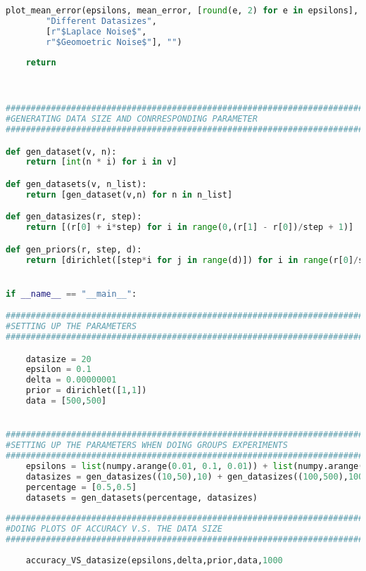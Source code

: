 \begin{lstlisting}[label = code-p2-2a, language=Python, caption=Python Code for experimenting]
	plot_mean_error(epsilons, mean_error, [round(e, 2) for e in epsilons], 
		"Different Datasizes", 
		[r"$Laplace Noise$",
		r"$Geomoetric Noise$"], "")
	
	return



#############################################################################
#GENERATING DATA SIZE AND CONRRESPONDING PARAMETER
#############################################################################

def gen_dataset(v, n):
	return [int(n * i) for i in v]

def gen_datasets(v, n_list):
	return [gen_dataset(v,n) for n in n_list]

def gen_datasizes(r, step):
	return [(r[0] + i*step) for i in range(0,(r[1] - r[0])/step + 1)]

def gen_priors(r, step, d):
	return [dirichlet([step*i for j in range(d)]) for i in range(r[0]/step,r[1]/step + 1)]


if __name__ == "__main__":

#############################################################################
#SETTING UP THE PARAMETERS
#############################################################################

	datasize = 20
	epsilon = 0.1
	delta = 0.00000001
	prior = dirichlet([1,1])
	data = [500,500]


#############################################################################
#SETTING UP THE PARAMETERS WHEN DOING GROUPS EXPERIMENTS
#############################################################################
	epsilons = list(numpy.arange(0.01, 0.1, 0.01)) + list(numpy.arange(0.1, 0.5, 0.05))
	datasizes = gen_datasizes((10,50),10) + gen_datasizes((100,500),100) + gen_datasizes((600,1000),200)# + gen_datasizes((1000,5000),1000)#[300] #[8,12,18,24,30,36,42,44,46,48]#,50,52,54,56,58,60,62,64,66,68,70,72,74,76,78,80]
	percentage = [0.5,0.5]
	datasets = gen_datasets(percentage, datasizes)
	
#############################################################################
#DOING PLOTS OF ACCURACY V.S. THE DATA SIZE
#############################################################################
	
	accuracy_VS_datasize(epsilons,delta,prior,data,1000

\end{lstlisting}


